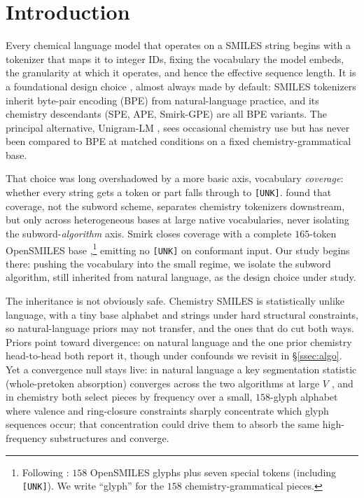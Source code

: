 \documentclass{article}
\begin{document}
\section{Introduction}\label{sec:intro}

Every chemical language model that operates on a SMILES string
\citep{weininger1988smiles} begins with a tokenizer that maps it to integer
IDs, fixing the vocabulary the model embeds, the granularity
at which it operates, and hence the effective sequence
length. It is a foundational design choice
\citep{alqahtani2026stop,kalamkar2025tokenization}, almost always made by
default: SMILES tokenizers inherit byte-pair encoding (BPE)
\citep{sennrich2016bpe-nmt} from natural-language practice, and its chemistry
descendants (SPE, APE, Smirk-GPE) are all BPE variants. The principal
alternative, Unigram-LM \citep{kudo2018subword-reg}, sees occasional chemistry
use but has never been compared to BPE at matched conditions on a fixed
chemistry-grammatical base.

That choice was long overshadowed by a more basic axis, vocabulary
\emph{coverage}: whether every string gets a token or part falls through to
\texttt{[UNK]}.
\citet{wadell2026smirk} found that coverage, not the subword scheme, separates
chemistry tokenizers downstream, but only across heterogeneous bases at large
native vocabularies, never isolating the subword-\emph{algorithm} axis. Smirk
\citep{wadell2026smirk} closes coverage with a complete $165$-token OpenSMILES
base \citep{james2016opensmiles},\footnote{Following \citet{wadell2026smirk}: $158$
OpenSMILES glyphs plus seven special tokens (including \texttt{[UNK]}).
We write ``glyph'' for the $158$ chemistry-grammatical pieces.}
emitting no \texttt{[UNK]} on conformant input. Our study begins there: pushing
the vocabulary into the small regime, we isolate the subword algorithm, still
inherited from natural language, as the design choice under study.

The inheritance is not obviously safe. Chemistry SMILES is statistically unlike
language, with a tiny base alphabet and strings under hard structural
constraints, so natural-language priors may not transfer, and the ones that do
cut both ways. Priors point toward divergence: \citet{bostrom2020bpe-suboptimal}
on natural language and the one prior chemistry head-to-head both report it,
though under confounds we revisit in \S\ref{ssec:algo}. Yet a convergence null
stays live: in natural language a key segmentation statistic (whole-pretoken
absorption) converges across the two algorithms at large $V$
\citep{reddy2025diminishing-tokenization}, and in chemistry both select pieces by
frequency over a small, $158$-glyph alphabet where valence and ring-closure
constraints sharply concentrate which glyph sequences occur; that concentration
could drive them to absorb the same high-frequency substructures and converge.
\end{document}
